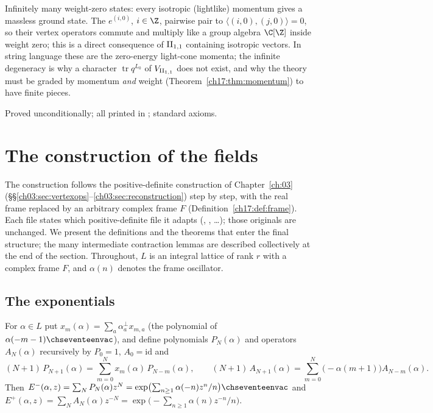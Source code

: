 \begin{physics}
Infinitely many weight-zero states: every isotropic (lightlike) momentum gives a massless ground state.  The
$e^{(i,0)}$, $i\in\Z$, pairwise pair to $\langle(i,0),(j,0)\rangle=0$, so their vertex operators commute and multiply
like a group algebra $\C[\Z]$ inside weight zero; this is a direct consequence of ${\mathrm{II}_{1,1}}$ containing isotropic
vectors.  In
string language these are the zero-energy light-cone momenta; the infinite degeneracy is why a character
$\operatorname{tr}q^{L_0}$ of ${V_{\mathrm{II}_{1,1}}}$ does not exist, and why the theory must be graded by momentum
\emph{and} weight (Theorem~\ref{ch17:thm:momentum}) to have finite pieces.
\end{physics}

\begin{status}
Proved unconditionally; all printed in ; standard axioms.
\end{status}

\section{The construction of the fields}\label{ch17:sec:construction}

The construction follows the positive-definite construction of Chapter~\ref{ch:03}
(\S\S\ref{ch03:sec:vertexops}--\ref{ch03:sec:reconstruction}) step by step, with the real frame replaced by
an arbitrary complex frame $F$ (Definition~\ref{ch17:def:frame}).  Each file states which positive-definite
file it adapts (, , …); those originals are unchanged.
We present the definitions and the theorems that enter the final structure; the many intermediate
contraction lemmas are described collectively at the end of the section.  Throughout, $L$ is an integral
lattice of rank $r$ with a complex frame $F$, and $\alpha(n)$ denotes the frame oscillator.

\subsection{The exponentials}

\begin{definition}\label{ch17:def:exponentials}
For $\alpha\in L$ put $x_m(\alpha)=\sum_a\alpha^\perp_ax_{m,a}$ (the polynomial of $\alpha(-m-1)\chseventeenvac$), and define
polynomials $P_N(\alpha)$ and operators $A_N(\alpha)$ recursively by $P_0=1$, $A_0=\mathrm{id}$ and
\begin{equation*}
  (N+1)\,P_{N+1}(\alpha)=\sum_{m=0}^{N}x_m(\alpha)\,P_{N-m}(\alpha),\qquad
  (N+1)\,A_{N+1}(\alpha)=\sum_{m=0}^{N}\bigl(-\alpha(m+1)\bigr)A_{N-m}(\alpha).
\end{equation*}
Then $E^-(\alpha,z)=\sum_NP_N(\alpha)z^N=\exp\bigl(\sum_{n\ge1}\alpha(-n)z^n/n\bigr)\chseventeenvac$ and
$E^+(\alpha,z)=\sum_NA_N(\alpha)z^{-N}=\exp\bigl(-\sum_{n\ge1}\alpha(n)z^{-n}/n\bigr)$.
\end{definition}

